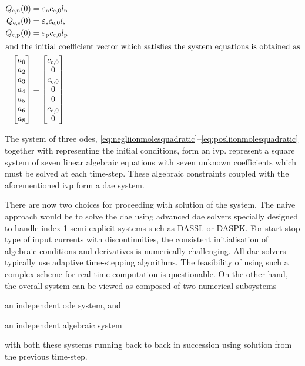 \begin{align}
    Q_\text{e,n}(0) & = \varepsilon_\text{n} c_\text{e,0} l_\text{n} \label{eq:Qeninit}\\
    Q_\text{e,s}(0) & = \varepsilon_\text{s} c_\text{e,0} l_\text{s}\\
    Q_\text{e,p}(0) & = \varepsilon_\text{p} c_\text{e,0} l_\text{p} \label{eq:Qepinit}\\
    \shortintertext{and the initial coefficient vector which satisfies the system
    equations is obtained as}
    \begin{bmatrix}
        a_0 \\
        a_2 \\
        a_3 \\
        a_4 \\
        a_5 \\
        a_6 \\
        a_8
        \end{bmatrix} & = \begin{bmatrix}
        c_\text{e,0} \\
        0 \\
        c_\text{e,0} \\
        0 \\
        0 \\
        c_\text{e,0} \\
        0
    \end{bmatrix} \label{eq:coeffinit}
\end{align}

The             system             of             three             \glspl{ode},
\eqref{eq:negliionmolesquadratic}--\eqref{eq:posliionmolesquadratic}    together
with    representing the  initial  conditions,
form   an    \gls{ivp}.   
represent a square system of seven linear algebraic equations with seven unknown
coefficients which must be solved at each time-step. These algebraic constraints
coupled with the aforementioned \gls{ivp} form a \gls{dae} system.

There are now two choices for proceeding  with solution of the system. The naive
approach  would be  to  solve  the \gls{dae}  using  advanced \gls{dae}  solvers
specially designed to handle \mbox{index-1}  semi-explicit systems such as DASSL
or  DASPK. For  start-stop  type  of input  currents  with discontinuities,  the
consistent initialisation of algebraic conditions and derivatives is numerically
challenging.  All   \gls{dae}  solvers  typically  use   adaptive  time-stepping
algorithms.  The  feasibility of  using  such  a  complex scheme  for  real-time
computation is questionable. On the other hand, the overall system can be viewed
as composed of two numerical subsystems ---
\begin{enumerate*}[label=\emph{\alph*})]
    \item an independent \gls{ode} system, and
    \item an independent algebraic system
\end{enumerate*}
with both these  systems running back to back in  succession using solution from
the previous time-step.

